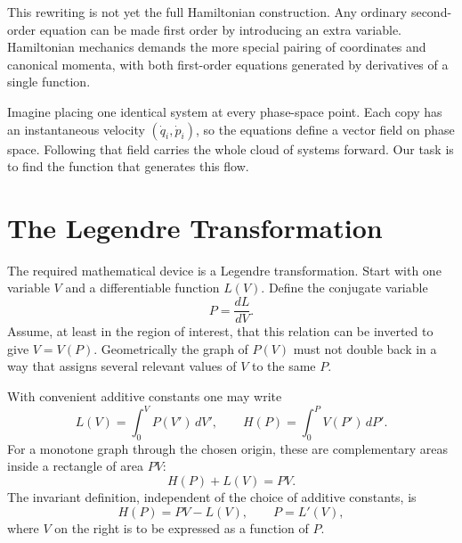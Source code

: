 This rewriting is not yet the full Hamiltonian construction. Any ordinary
second-order equation can be made first order by introducing an extra
variable. Hamiltonian mechanics demands the more special pairing of
coordinates and canonical momenta, with both first-order equations generated
by derivatives of a single function.

\begin{classroomqa}
\end{classroomqa}

Imagine placing one identical system at every phase-space point. Each copy
has an instantaneous velocity \((\dot q_i,\dot p_i)\), so the equations define
a vector field on phase space. Following that field carries the whole cloud
of systems forward. Our task is to find the function that generates this
flow.

\section{The Legendre Transformation}

The required mathematical device is a Legendre transformation. Start with
one variable \(V\) and a differentiable function \(L(V)\). Define the
conjugate variable
\begin{equation}
 P=\frac{dL}{dV}.
 \label{eq:l06-legendre-p}
\end{equation}
Assume, at least in the region of interest, that this relation can be inverted
to give \(V=V(P)\). Geometrically the graph of \(P(V)\) must not double back
in a way that assigns several relevant values of \(V\) to the same \(P\).

With convenient additive constants one may write
\begin{equation}
 L(V)=\int_0^V P(V')\,dV',
 \qquad
 H(P)=\int_0^P V(P')\,dP'.
 \label{eq:l06-legendre-areas}
\end{equation}
For a monotone graph through the chosen origin, these are complementary areas
inside a rectangle of area \(PV\):
\begin{equation}
 H(P)+L(V)=PV.
 \label{eq:l06-complementary-area}
\end{equation}
The invariant definition, independent of the choice of additive constants,
is
\begin{equation}
 \boxed{H(P)=PV-L(V),}
 \qquad P=L'(V),
 \label{eq:l06-legendre-definition}
\end{equation}
where \(V\) on the right is to be expressed as a function of \(P\).

